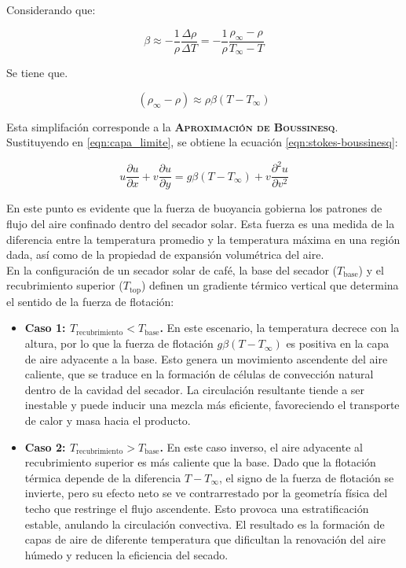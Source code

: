 \documentclass[12pt]{article}
\begin{document}
Considerando que: 


$$\beta \approx -\frac{1}{\rho}\frac{\Delta\rho}{\Delta T} = -\frac{1}{\rho}\frac{\rho_\infty-\rho}{T_\infty-T}$$

Se tiene que.

$$(\rho_\infty-\rho)\approx\rho\beta(T-T_\infty)$$

Esta simplifación corresponde a la \textsc{\textbf{Aproximación de Boussinesq}}. Sustituyendo en \ref{eqn:capa_limite}, se obtiene la ecuación \ref{eqn:stokes-boussinesq}:

\begin{equation}
\label{eqn:stokes-boussinesq}
    u\frac{\partial u}{\partial x}+v\frac{\partial u}{\partial y} = g\beta(T-T_\infty)+v\frac{\partial^2u}{\partial v^2}
\end{equation}

En este punto es evidente que la fuerza de buoyancia gobierna los patrones de flujo del aire confinado dentro del secador solar. Esta fuerza es una medida de la diferencia entre la temperatura promedio y la temperatura máxima en una región dada, así como de la propiedad de expansión volumétrica del aire. \\


En la configuración de un secador solar de café, la base del secador ($T_\text{base}$) y el recubrimiento superior ($T_\text{top}$) definen un gradiente térmico vertical que determina el sentido de la fuerza de flotación:\\

\begin{itemize}
    \item \textbf{Caso 1: $T_\text{recubrimiento} < T_\text{base}$.}  
    En este escenario, la temperatura decrece con la altura, por lo que la fuerza de flotación $g\beta(T - T_\infty)$ es positiva en la capa de aire adyacente a la base. Esto genera un movimiento ascendente del aire caliente, que se traduce en la formación de células de convección natural dentro de la cavidad del secador. La circulación resultante tiende a ser inestable y puede inducir una mezcla más eficiente, favoreciendo el transporte de calor y masa hacia el producto.
    
    \item \textbf{Caso 2: $T_\text{recubrimiento} > T_\text{base}$.}  
    En este caso inverso, el aire adyacente al recubrimiento superior es más caliente que la base. Dado que la flotación térmica depende de la diferencia $T-T_\infty$, el signo de la fuerza de flotación se invierte, pero su efecto neto se ve contrarrestado por la geometría física del techo que restringe el flujo ascendente. Esto provoca una estratificación estable, anulando la circulación convectiva. El resultado es la formación de capas de aire de diferente temperatura que dificultan la renovación del aire húmedo y reducen la eficiencia del secado.
\end{itemize}
\end{document}
